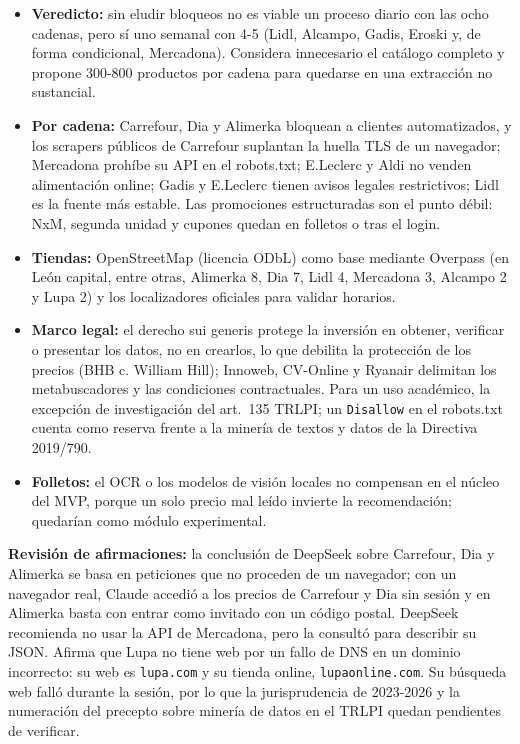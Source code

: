 \begin{tcolorbox}[colback=responsecolor, title=Insights de DeepSeek, colframe=gray!60!black, breakable]
	\begin{itemize}
		\item \textbf{Veredicto:} sin eludir bloqueos no es viable un proceso diario con las ocho cadenas, pero sí uno semanal con 4-5 (Lidl, Alcampo, Gadis, Eroski y, de forma condicional, Mercadona). Considera innecesario el catálogo completo y propone 300-800 productos por cadena para quedarse en una extracción no sustancial.

		\item \textbf{Por cadena:} Carrefour, Dia y Alimerka bloquean a clientes automatizados, y los scrapers públicos de Carrefour suplantan la huella TLS de un navegador; Mercadona prohíbe su API en el robots.txt; E.Leclerc y Aldi no venden alimentación online; Gadis y E.Leclerc tienen avisos legales restrictivos; Lidl es la fuente más estable. Las promociones estructuradas son el punto débil: NxM, segunda unidad y cupones quedan en folletos o tras el login.

		\item \textbf{Tiendas:} OpenStreetMap (licencia ODbL) como base mediante Overpass (en León capital, entre otras, Alimerka 8, Dia 7, Lidl 4, Mercadona 3, Alcampo 2 y Lupa 2) y los localizadores oficiales para validar horarios.

		\item \textbf{Marco legal:} el derecho sui generis protege la inversión en obtener, verificar o presentar los datos, no en crearlos, lo que debilita la protección de los precios (BHB c. William Hill); Innoweb, CV-Online y Ryanair delimitan los metabuscadores y las condiciones contractuales. Para un uso académico, la excepción de investigación del art.~135 TRLPI; un \texttt{Disallow} en el robots.txt cuenta como reserva frente a la minería de textos y datos de la Directiva 2019/790.

		\item \textbf{Folletos:} el OCR o los modelos de visión locales no compensan en el núcleo del MVP, porque un solo precio mal leído invierte la recomendación; quedarían como módulo experimental.
	\end{itemize}
\end{tcolorbox}

\textbf{Revisión de afirmaciones:} la conclusión de DeepSeek sobre Carrefour, Dia y Alimerka se basa en peticiones que no proceden de un navegador; con un navegador real, Claude accedió a los precios de Carrefour y Dia sin sesión y en Alimerka basta con entrar como invitado con un código postal. DeepSeek recomienda no usar la API de Mercadona, pero la consultó para describir su JSON. Afirma que Lupa no tiene web por un fallo de DNS en un dominio incorrecto: su web es \texttt{lupa.com} y su tienda online, \texttt{lupaonline.com}. Su búsqueda web falló durante la sesión, por lo que la jurisprudencia de 2023-2026 y la numeración del precepto sobre minería de datos en el TRLPI quedan pendientes de verificar.

